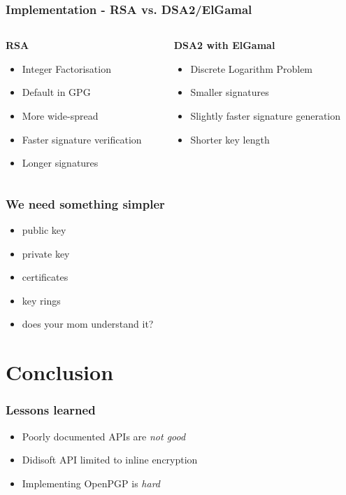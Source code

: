 \documentclass{beamer}
\begin{document}
\begin{frame}
\frametitle{Implementation - RSA vs. DSA2/ElGamal}
\begin{columns}[onlytextwidth]
\begin{column}{0.45\textwidth} %
\centering
\textbf{RSA}
\begin{itemize}
\item Integer Factorisation
\item Default in GPG \cite{wk}
\item More wide-spread
\item Faster signature verification
\item Longer signatures
\end{itemize}
\end{column}

\begin{column}{0.45\textwidth} %
\centering
\textbf{DSA2 with ElGamal}
\begin{itemize}
\item Discrete Logarithm Problem
\item Smaller signatures
\item Slightly faster signature generation
\item Shorter key length
\end{itemize}
\end{column}
\end{columns}
\end{frame}

\begin{frame}
\frametitle{We need something simpler}
\begin{itemize}
\item public key
\item private key
\item certificates
\item key rings
\item does your mom understand it?
\end{itemize}
\end{frame}


\section{Conclusion}
\begin{frame}
\frametitle{Lessons learned}
\begin{itemize}
\item Poorly documented APIs are \emph{not good}
\item Didisoft API limited to inline encryption \cite{dd}
\item Implementing OpenPGP is \emph{hard}
\end{itemize}
\end{frame}
\end{document}
